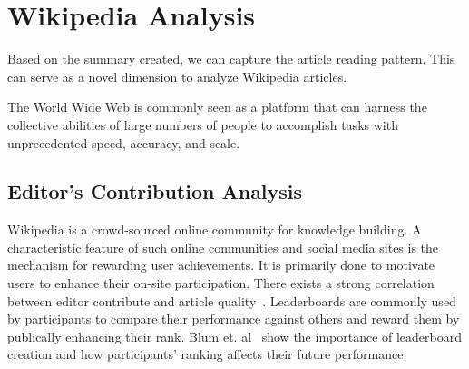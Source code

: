 \documentclass[12pt]{article}
\begin{document}
%
%


\section{Wikipedia Analysis}\label{sec:Analysis}
Based on the summary created, we can capture the article reading pattern. This can serve as a novel dimension to analyze Wikipedia articles. 

The World Wide Web is commonly seen as a platform that can harness the collective abilities of large numbers of people to accomplish tasks with unprecedented speed, accuracy, and scale.
    
\subsection{Editor's Contribution Analysis}
Wikipedia is a crowd-sourced online community for knowledge building. A characteristic feature of such online communities and social media sites is the mechanism for rewarding user achievements. It is primarily done to motivate users to enhance their on-site participation. There exists a strong correlation between editor contribute and article quality~\cite{li2015automatically}. 
Leaderboards are commonly used by participants to compare their performance against others and reward them by publically enhancing their rank. Blum et. al~\cite{blum2015ladder} show the importance of leaderboard creation and how participants' ranking affects their future performance.
\end{document}
